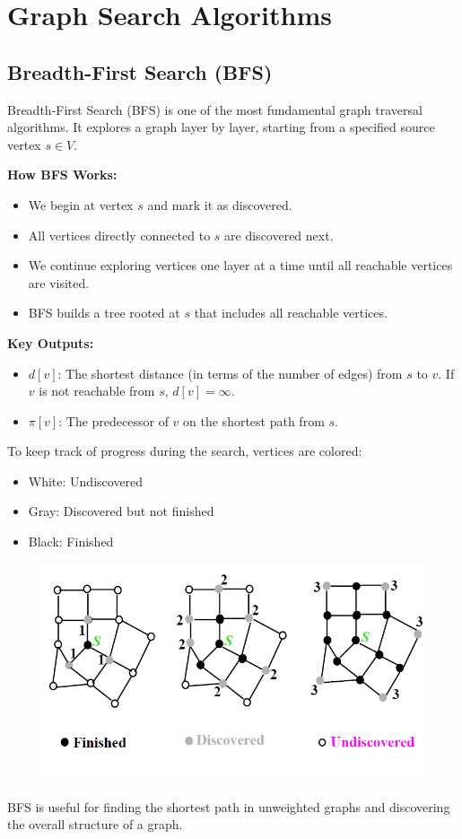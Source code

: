 \section{Graph Search Algorithms}
\subsection{Breadth-First Search (BFS)}
Breadth-First Search (BFS) is one of the most fundamental graph traversal algorithms. It explores a graph layer by layer, starting from a specified source vertex $s\in V$.

\textbf{How BFS Works:}
\begin{itemize}
    \item We begin at vertex $s$ and mark it as discovered.
    \item All vertices directly connected to $s$ are discovered next.
    \item We continue exploring vertices one layer at a time until all reachable vertices are visited.
    \item BFS builds a tree rooted at $s$ that includes all reachable vertices.
\end{itemize}

\textbf{Key Outputs:}
\begin{itemize}
    \item $d[v]$: The shortest distance (in terms of the number of edges) from $s$ to $v$. If $v$ is not reachable from $s$, $d[v] = \infty$.
    \item $\pi[v]$: The predecessor of $v$ on the shortest path from $s$.
\end{itemize}

To keep track of progress during the search, vertices are colored:
\begin{itemize}
    \item White: Undiscovered
    \item Gray: Discovered but not finished
    \item Black: Finished
\end{itemize}
\begin{figure}[h]
    \centering
\includegraphics[width=0.75\linewidth]{Breadth-Firs-Search.png}

\end{figure}
BFS is useful for finding the shortest path in unweighted graphs and discovering the overall structure of a graph.

